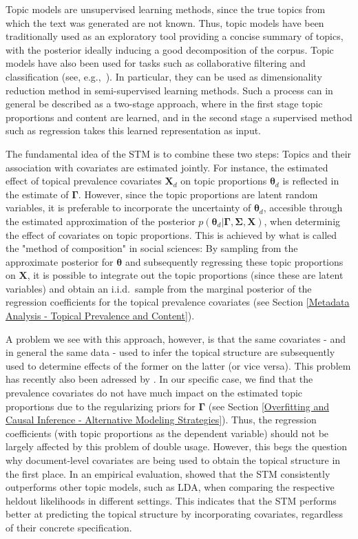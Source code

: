 Topic models are unsupervised learning methods, since the true topics from which the text was generated are not known. Thus, topic models have been traditionally used as an exploratory tool providing a concise summary of topics, with the posterior ideally inducing a good decomposition of the corpus. Topic models have also been used for tasks such as collaborative filtering and classification (see, e.g.,\ \citealp{blei2003latent}). In particular, they can be used as dimensionality reduction method in semi-supervised learning methods. Such a process can in general be described as a two-stage approach, where in the first stage topic proportions and content are learned, and in the second stage a supervised method such as regression takes this learned representation as input. 

The fundamental idea of the STM is to combine these two steps: Topics and their association with covariates are estimated jointly. For instance, the estimated effect of topical prevalence covariates $\boldsymbol{X}_d$ on topic proportions $\boldsymbol{\theta}_d$ is reflected in the estimate of $\boldsymbol{\Gamma}$. However, since the topic proportions are latent random variables, it is preferable to incorporate the uncertainty of $\boldsymbol{\theta}_d$, accesible through the estimated approximation of the posterior $p(\boldsymbol{\theta}_d | \boldsymbol{\Gamma}, \boldsymbol{\Sigma}, \boldsymbol{X})$, when determinig the effect of covariates on topic proportions. This is achieved by what is called the "method of composition" in social sciences: By sampling from the approximate posterior for $\boldsymbol{\theta}$ and subsequently regressing these topic proportions on $\boldsymbol{X}$, it is possible to integrate out the topic proportions (since these are latent variables) and obtain an i.i.d.\ sample from the marginal posterior of the regression coefficients for the topical prevalence covariates (see Section \ref{Metadata Analysis - Topical Prevalence and Content}).

A problem we see with this approach, however, is that the same covariates - and in general the same data - used to infer the topical structure are subsequently used to determine effects of the former on the latter (or vice versa). This problem has recently also been adressed by \cite{egami2018make}. In our specific case, we find that the prevalence covariates do not have much impact on the estimated topic proportions due to the regularizing priors for $\boldsymbol{\Gamma}$ (see Section \ref{Overfitting and Causal Inference - Alternative Modeling Strategies}). Thus, the regression coefficients (with topic proportions as the dependent variable) should not be largely affected by this problem of double usage. However, this begs the question why document-level covariates are being used to obtain the topical structure in the first place. In an empirical evaluation, \cite{roberts2016model} showed that the STM consistently outperforms other topic models, such as LDA, when comparing the respective heldout likelihoods in different settings. This indicates that the STM performs better at predicting the topical structure by incorporating covariates, regardless of their concrete specification.

